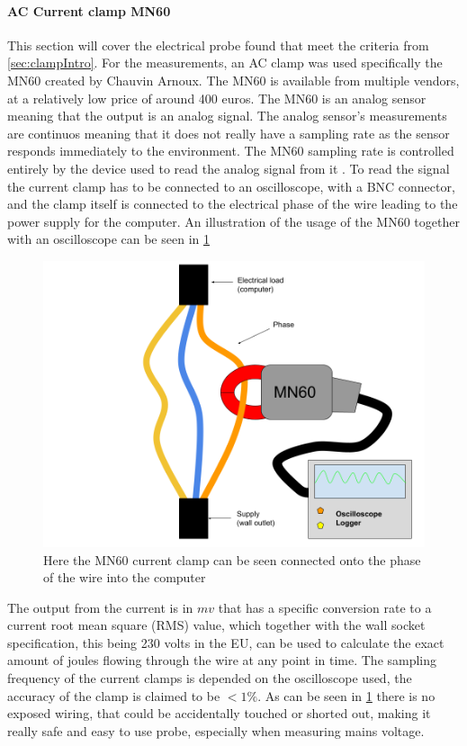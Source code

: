 \paragraph*{AC Current clamp MN60}

This section will cover the electrical probe found that meet the criteria from \ref{sec:clampIntro}. For the measurements, an AC clamp was used specifically the MN60 created by Chauvin Arnoux. The MN60 is available from multiple vendors, at a relatively low price of around 400 euros. The MN60 is an analog sensor meaning that the output is an analog signal. The analog sensor's measurements are continuos meaning that it does not really have a sampling rate as the sensor responds immediately to the environment\cite{agarwal2005foundations}. The MN60 sampling rate is controlled entirely by the device used to read the analog signal from it \cite{agarwal2005foundations}. To read the signal the current clamp has to be connected to an oscilloscope, with a BNC connector\cite{ClampDoc}, and the clamp itself is connected to the electrical phase of the wire leading to the power supply for the computer. An illustration of the usage of the MN60 together with an oscilloscope can be seen in \cref{fig:clampSetup}
\begin{figure}[h!]
    \centering
    \includegraphics*[scale=0.25]{figures/CLAMP.png}
    \caption{Here the MN60 current clamp can be seen connected onto the phase of the wire into the computer}
    \label{fig:clampSetup}
\end{figure}
The output from the current is in $mv$ that has a specific conversion rate to a current root mean square (RMS) value, which together with the wall socket specification, this being 230 volts in the EU\cite{sik}, can be used to calculate the exact amount of joules flowing through the wire at any point in time. The sampling frequency of the current clamps is depended on the oscilloscope used, the accuracy of the clamp is claimed to be $<1\%$\cite{ClampDoc}. As can be seen in \ref{fig:clampSetup} there is no exposed wiring, that could be accidentally touched or shorted out, making it really safe and easy to use probe, especially when measuring mains voltage.


